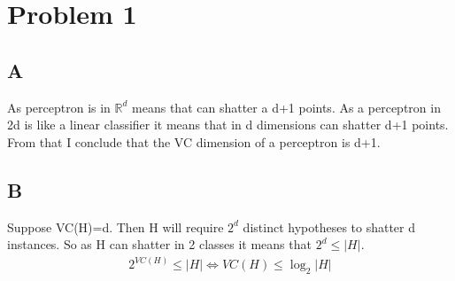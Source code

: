 \section{Problem 1}
\subsection{A}
As perceptron is in $\mathbb{R}^d$ means that can shatter a d+1
points. As a perceptron in 2d is like a linear classifier it means
that in d dimensions can shatter d+1 points. From that I conclude that 
the VC dimension of a perceptron is d+1.
\subsection{B}
Suppose VC(H)=d. Then H will require $2^d$ distinct hypotheses to shatter d instances.
So as H can shatter in 2 classes it means that $2^d \leq \lvert H\rvert$.
\begin{eqnarray}
2^{VC(H)} \leq \lvert H\rvert \Leftrightarrow
VC(H) \leq \log_2 \lvert H\rvert
\end{eqnarray}
